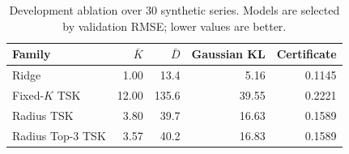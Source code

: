 \begin{table}[htbp]
\centering
\caption{Development ablation over 30 synthetic series. Models are selected by validation RMSE; lower values are better.}
\label{tab:structural_overall}
\small
\setlength{\tabcolsep}{3.2pt}
\begin{tabular}{lrrrr}
\toprule
Family & $\bar K$ & $\bar D$ & Gaussian KL & Certificate \\
\midrule
Ridge & 1.00 & 13.4 & 5.16 & 0.1145 \\
Fixed-$K$ TSK & 12.00 & 135.6 & 39.55 & 0.2221 \\
Radius TSK & 3.80 & 39.7 & 16.63 & 0.1589 \\
Radius Top-3 TSK & 3.57 & 40.2 & 16.83 & 0.1589 \\
\bottomrule
\end{tabular}
\end{table}
